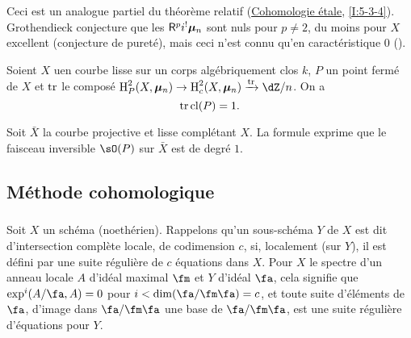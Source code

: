 Ceci est un analogue partiel du théorème relatif 
(\hyperref[I]{Cohomologie étale}, \ref{I:5-3-4}). Grothendieck conjecture 
que les $\mathsf{R}^p i^! {\bm\mu}_n$ sont nuls pour $p\ne 2$, du moins pour $X$ excellent 
(conjecture de pureté), mais ceci n'est connu qu'en caractéristique $0$ 
(\cite[XIX]{sga4}). 




\begin{theorem}\label{IV:2-1-5}
Soient $X$ uen courbe lisse sur un corps algébriquement clos $k$, $P$ un 
point fermé de $X$ et $\operatorname{tr}$ le composé $\h_P^2(X,\dmu_n) \to \h_c^2(X,\dmu_n) \xrightarrow{\tr} \dZ/n$. On a 
\[
  \operatorname{tr} \operatorname{cl}(P) = 1 \text{.}
\]
\end{theorem}

Soit $\bar X$ la courbe projective et lisse complétant $X$. La formule 
exprime que le faisceau inversible $\sO(P)$ sur $\bar X$ est de degré $1$. 










\subsection{Méthode cohomologique}\label{IV:2-2}





\subsubsection{}\label{IV:2-2-1}

Soit $X$ un schéma (noethérien). Rappelons qu'un sous-schéma $Y$ de $X$ 
est dit d'intersection complète locale, de codimension $c$, si, localement 
(sur $Y$), il est défini par une suite régulière de $c$ équations dans 
$X$. Pour $X$ le spectre d'un anneau locale $A$ d'idéal maximal $\fm$ et 
$Y$ d'idéal $\fa$, cela signifie que $\exp^i(A/\fa,A) = 0$ pour 
$i<\dim(\fa/\fm\fa)=c$, et toute suite d'éléments de $\fa$, d'image dans 
$\fa/\fm\fa$ une base de $\fa/\fm\fa$, est une suite régulière 
d'équations pour $Y$. 





\subsubsection{}\label{IV:2-2-2}

